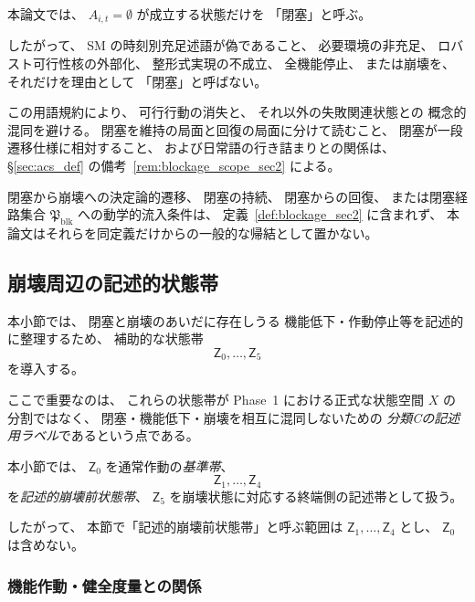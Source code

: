 \begin{remark}[「閉塞」という用語の使用範囲]
\label{rem:blockage_terminology}
本論文では、
$A_{i,t}=\emptyset$
が成立する状態だけを
「閉塞」と呼ぶ。

したがって、
SM の時刻別充足述語が偽であること、
必要環境の非充足、
ロバスト可行性核の外部化、
整形式実現の不成立、
全機能停止、
または崩壊を、
それだけを理由として
「閉塞」と呼ばない。

この用語規約により、
可行行動の消失と、
それ以外の失敗関連状態との
概念的混同を避ける。
閉塞を維持の局面と回復の局面に分けて読むこと、
閉塞が一段遷移仕様に相対すること、
および日常語の行き詰まりとの関係は、
\S\ref{sec:acs_def} の備考~\ref{rem:blockage_scope_sec2} による。
\end{remark}

\begin{remark}[閉塞の定義に含まれない事項]
\label{rem:blockage_in_precollapse}
閉塞から崩壊への決定論的遷移、
閉塞の持続、
閉塞からの回復、
または閉塞経路集合
$\mathfrak{P}_{\mathrm{blk}}$
への動学的流入条件は、
定義~\ref{def:blockage_sec2} に含まれず、
本論文はそれらを同定義だけからの一般的な帰結として置かない。
\end{remark}

\subsection{崩壊周辺の記述的状態帯}
\label{subsec:precollapse_states}


本小節では、
閉塞と崩壊のあいだに存在しうる
機能低下・作動停止等を記述的に整理するため、
補助的な状態帯
\[
  \mathsf{Z}_0,\ldots,\mathsf{Z}_5
\]
を導入する。

ここで重要なのは、
これらの状態帯が
Phase~1 における正式な状態空間 $X$ の分割ではなく、
閉塞・機能低下・崩壊を相互に混同しないための
\emph{分類Cの記述用ラベル}であるという点である。

本小節では、
$\mathsf{Z}_0$
を通常作動の\emph{基準帯}、
\[
  \mathsf{Z}_1,\ldots,\mathsf{Z}_4
\]
を\emph{記述的崩壊前状態帯}、
$\mathsf{Z}_5$
を崩壊状態に対応する終端側の記述帯として扱う。

したがって、
本節で「記述的崩壊前状態帯」と呼ぶ範囲は
$\mathsf{Z}_1,\ldots,\mathsf{Z}_4$
とし、
$\mathsf{Z}_0$ は含めない。

\subsubsection{機能作動・健全度量との関係}

